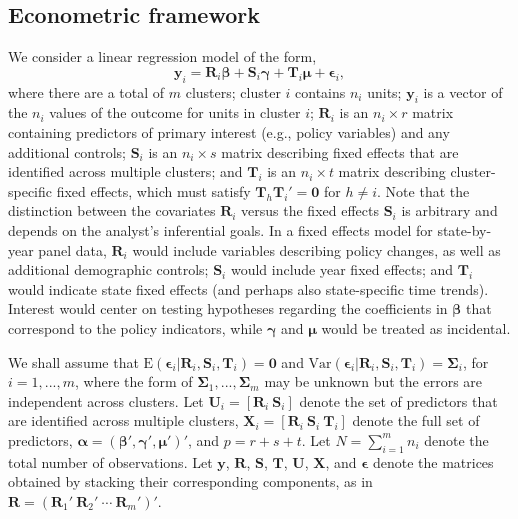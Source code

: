 \documentclass[12pt]{article}
\begin{document}
\hypertarget{econometric-framework}{%
\subsection{Econometric framework}\label{econometric-framework}}

We consider a linear regression model of the form, \begin{equation}
\label{eq:fixed_effects}
\mathbf{y}_i = \mathbf{R}_i \boldsymbol\beta + \mathbf{S}_i \boldsymbol\gamma + \mathbf{T}_i \boldsymbol\mu + \boldsymbol\epsilon_i,
\end{equation} where there are a total of \(m\) clusters; cluster \(i\)
contains \(n_i\) units; \(\mathbf{y}_i\) is a vector of the \(n_i\)
values of the outcome for units in cluster \(i\); \(\mathbf{R}_i\) is an
\(n_i \times r\) matrix containing predictors of primary interest (e.g.,
policy variables) and any additional controls; \(\mathbf{S}_i\) is an
\(n_i \times s\) matrix describing fixed effects that are identified
across multiple clusters; and \(\mathbf{T}_i\) is an \(n_i \times t\)
matrix describing cluster-specific fixed effects, which must satisfy
\(\mathbf{T}_h \mathbf{T}_i' = \mathbf{0}\) for \(h \neq i\). Note that
the distinction between the covariates \(\mathbf{R}_i\) versus the fixed
effects \(\mathbf{S}_i\) is arbitrary and depends on the analyst's
inferential goals. In a fixed effects model for state-by-year panel
data, \(\mathbf{R}_i\) would include variables describing policy
changes, as well as additional demographic controls; \(\mathbf{S}_i\)
would include year fixed effects; and \(\mathbf{T}_i\) would indicate
state fixed effects (and perhaps also state-specific time trends).
Interest would center on testing hypotheses regarding the coefficients
in \(\boldsymbol\beta\) that correspond to the policy indicators, while
\(\boldsymbol\gamma\) and \(\boldsymbol\mu\) would be treated as
incidental.

We shall assume that
\(\text{E}\left(\boldsymbol\epsilon_i\left|\mathbf{R}_i,\mathbf{S}_i, \mathbf{T}_i\right.\right) = \mathbf{0}\)
and
\(\text{Var}\left(\boldsymbol\epsilon_i\left|\mathbf{R}_i,\mathbf{S}_i,\mathbf{T}_i\right.\right) = \boldsymbol\Sigma_i\),
for \(i = 1,...,m\), where the form of
\(\boldsymbol\Sigma_1,...,\boldsymbol\Sigma_m\) may be unknown but the
errors are independent across clusters. Let
\(\mathbf{U}_i = \left[\mathbf{R}_i \ \mathbf{S}_i \right]\) denote the
set of predictors that are identified across multiple clusters,
\(\mathbf{X}_i = \left[\mathbf{R}_i \ \mathbf{S}_i \ \mathbf{T}_i \right]\)
denote the full set of predictors,
\(\boldsymbol\alpha = \left(\boldsymbol\beta', \boldsymbol\gamma', \boldsymbol\mu' \right)'\),
and \(p = r + s + t\). Let \(N = \sum_{i=1}^m n_i\) denote the total
number of observations. Let \(\mathbf{y}\), \(\mathbf{R}\),
\(\mathbf{S}\), \(\mathbf{T}\), \(\mathbf{U}\), \(\mathbf{X}\), and
\(\boldsymbol\epsilon\) denote the matrices obtained by stacking their
corresponding components, as in
\(\mathbf{R} = \left(\mathbf{R}_1' \ \mathbf{R}_2' \ \cdots \ \mathbf{R}_m'\right)'\).
\end{document}
